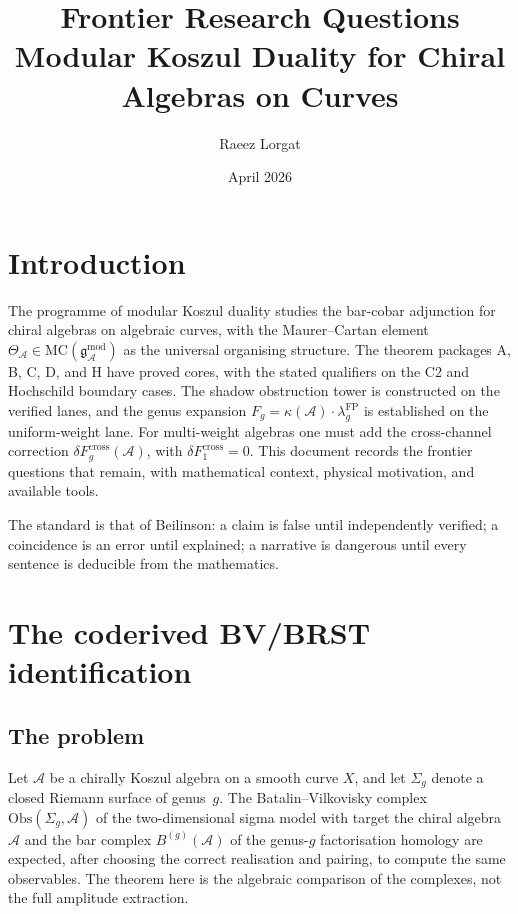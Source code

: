 \documentclass[11pt]{amsart}
\title{Frontier Research Questions\\[4pt]
\large Modular Koszul Duality for Chiral Algebras on Curves}
\author{Raeez Lorgat}
\date{April 2026}
\newcommand{\cA}{\mathcal{A}}
\newcommand{\MC}{\mathrm{MC}}
\newcommand{\g}{\mathfrak{g}}
\theoremstyle{plain}
\theoremstyle{definition}
\theoremstyle{remark}
\begin{document}
\maketitle

\tableofcontents

\section{Introduction}

The programme of modular Koszul duality studies the bar-cobar
adjunction for chiral algebras on algebraic curves, with the
Maurer--Cartan element
$\Theta_\cA \in \MC(\g_\cA^{\mathrm{mod}})$ as the universal
organising structure. The theorem packages A, B, C, D, and H
have proved cores, with the stated qualifiers on the C2 and
Hochschild boundary cases.  The shadow obstruction tower is
constructed on the verified lanes, and the genus expansion
$F_g = \kappa(\cA) \cdot \lambda_g^{\mathrm{FP}}$ is established
on the uniform-weight lane.  For multi-weight algebras one must
add the cross-channel correction
$\delta F_g^{\mathrm{cross}}(\cA)$, with
$\delta F_1^{\mathrm{cross}}=0$.  This document records the
frontier questions that remain, with mathematical context,
physical motivation, and available tools.

The standard is that of Beilinson: a claim is false until
independently verified; a coincidence is an error until explained;
a narrative is dangerous until every sentence is deducible from
the mathematics.

\section{The coderived BV/BRST identification}

\subsection{The problem}

Let $\cA$ be a chirally Koszul algebra on a smooth curve $X$,
and let $\Sigma_g$ denote a closed Riemann surface of genus~$g$.
The Batalin--Vilkovisky complex $\mathrm{Obs}(\Sigma_g, \cA)$ of
the two-dimensional sigma model with target the chiral algebra
$\cA$ and the bar complex $B^{(g)}(\cA)$ of the genus-$g$
factorisation homology are expected, after choosing the correct
realisation and pairing, to compute the same observables.  The
theorem here is the algebraic comparison of the complexes, not the
full amplitude extraction.
\end{document}
